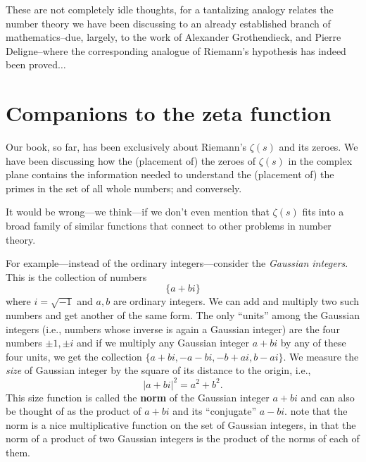 \documentclass[openany]{book}
\theoremstyle{plain}
\theoremstyle{definition}
\begin{document}
These are not completely idle thoughts, for a tantalizing analogy
relates the number theory we have been discussing to an already
established branch of mathematics--due, largely, to the work of
Alexander Grothendieck, and Pierre Deligne--where the corresponding
analogue of Riemann's hypothesis has indeed been proved$\dots$



\chapter{Companions to the zeta function}

Our book, so far, has been exclusively about Riemann's $\zeta(s)$ and
its zeroes. We have been discussing how the (placement of) the zeroes
of $\zeta(s)$ in the complex plane contains the information needed to
understand the (placement of) the primes in the set of all whole
numbers; and conversely.

It would be wrong---we think---if we don't even mention that
$\zeta(s)$ fits into a broad family of similar functions that connect to other problems in number theory.



For example---instead of the ordinary integers---consider the {\it
  Gaussian integers}. This is the collection of numbers
 $$ \{ a+bi\}$$
 where $i = {\sqrt{-1}}$ and $a,b$ are ordinary integers. We can add
 and multiply two such numbers and get another of the same form. The
 only ``units'' among the Gaussian integers (i.e., numbers whose
 inverse is again a Gaussian integer) are the four numbers $\pm 1, \pm
 i$ and if we multiply any Gaussian integer $a+bi$ by any of these
 four units, we get the collection $\{a+bi, -a-bi, -b+ai, b -ai\}$.
 We measure the {\it size} of Gaussian integer by the square of its
 distance to the origin, i.e., $$|a+bi|^2 = {a^2+b^2}.$$   This size function  is called the {\bf norm} of the Gaussian integer $a+bi$ and can also be thought of as  the product of $a+bi$ and its ``conjugate'' $a-bi$.   note that
 the norm is a nice multiplicative function on the set of Gaussian
 integers, in that the norm of a product of two Gaussian integers is
 the product of the norms of each of them.
\end{document}
